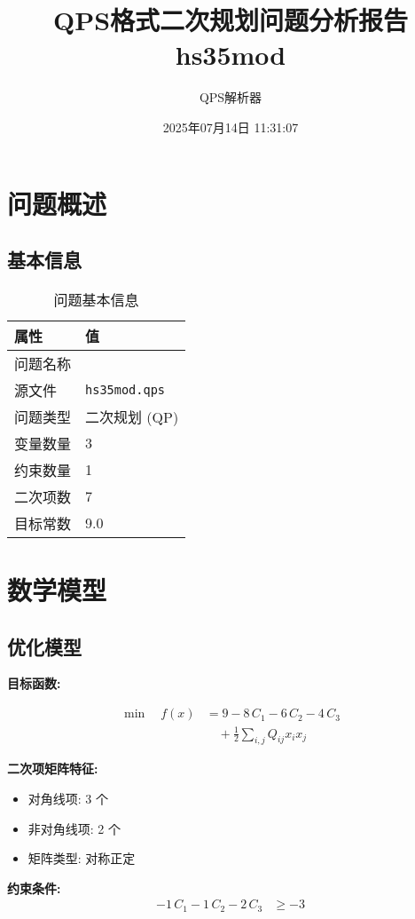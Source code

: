 \documentclass[a4paper,11pt]{article}
\title{QPS格式二次规划问题分析报告\\{\large hs35mod}}
\author{QPS解析器}
\date{2025年07月14日 11:31:07}
\begin{document}
\maketitle
\tableofcontents
\newpage

\section{问题概述}
\subsection{基本信息}
\begin{table}[h!]
\centering
\begin{tabular}{ll}
\toprule
\textbf{属性} & \textbf{值} \\
\midrule
问题名称 & \texttt{} \\
源文件 & \texttt{hs35mod.qps} \\
问题类型 & 二次规划 (QP) \\
变量数量 & 3 \\
约束数量 & 1 \\
二次项数 & 7 \\
目标常数 & 9.0 \\
\bottomrule
\end{tabular}
\caption{问题基本信息}
\end{table}

\section{数学模型}
\subsection{优化模型}

\textbf{目标函数:}

\begin{align}
\min\quad f(x) &= 9 - 8\,C_{1} - 6\,C_{2} - 4\,C_{3} \nonumber\\
&\quad + \frac{1}{2} \sum_{i,j} Q_{ij} x_i x_j\label{eq:objective}
\end{align}

\textbf{二次项矩阵特征:}
\begin{itemize}
\item 对角线项: 3 个
\item 非对角线项: 2 个
\item 矩阵类型: 对称正定
\end{itemize}

\textbf{约束条件:}
\begin{align}
-1\,C_{1} - 1\,C_{2} - 2\,C_{3} &\geq -3 \nonumber
\end{align}
\end{document}
